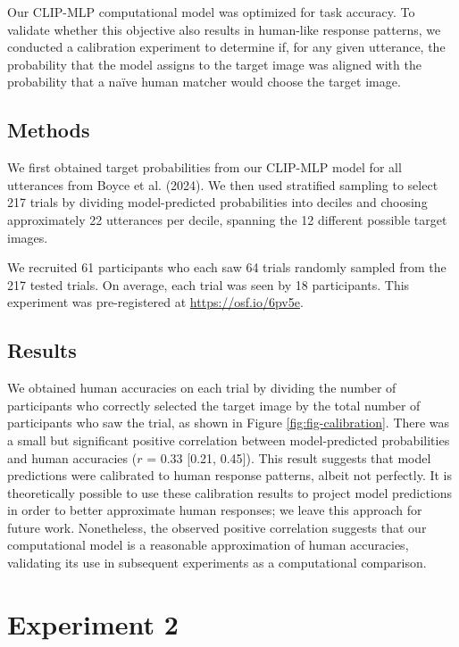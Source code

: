 \documentclass[10pt, letterpaper]{article}
\begin{document}
Our CLIP-MLP computational model was optimized for task accuracy. To
validate whether this objective also results in human-like response
patterns, we conducted a calibration experiment to determine if, for any
given utterance, the probability that the model assigns to the target
image was aligned with the probability that a naïve human matcher would
choose the target image.

\subsection{Methods}\label{methods}

We first obtained target probabilities from our CLIP-MLP model for all
utterances from Boyce et al. (2024). We then used stratified sampling to
select 217 trials by dividing model-predicted probabilities into deciles
and choosing approximately 22 utterances per decile, spanning the 12
different possible target images.

We recruited 61 participants who each saw 64 trials randomly sampled
from the 217 tested trials. On average, each trial was seen by 18
participants. This experiment was pre-registered at
\url{https://osf.io/6pv5e}.

\subsection{Results}\label{results}

We obtained human accuracies on each trial by dividing the number of
participants who correctly selected the target image by the total number
of participants who saw the trial, as shown in Figure
\ref{fig:fig-calibration}. There was a small but significant positive
correlation between model-predicted probabilities and human accuracies
(\(r\) = 0.33 {[}0.21, 0.45{]}). This result suggests that model
predictions were calibrated to human response patterns, albeit not
perfectly. It is theoretically possible to use these calibration results
to project model predictions in order to better approximate human
responses; we leave this approach for future work. Nonetheless, the
observed positive correlation suggests that our computational model is a
reasonable approximation of human accuracies, validating its use in
subsequent experiments as a computational comparison.

\section{Experiment 2}\label{experiment-2}
\end{document}
